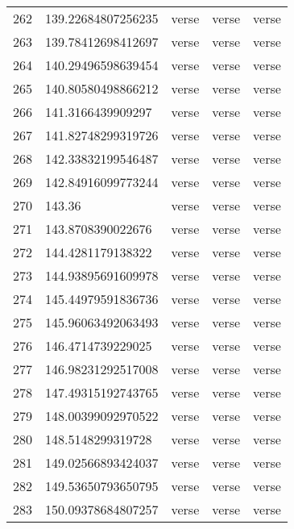 \begin{table}[]
\begin{tabular}{lllll}
    262  & 139.22684807256235 & verse        & verse           & verse          \\
    263  & 139.78412698412697 & verse        & verse           & verse          \\
    264  & 140.29496598639454 & verse        & verse           & verse          \\
    265  & 140.80580498866212 & verse        & verse           & verse          \\
    266  & 141.3166439909297  & verse        & verse           & verse          \\
    267  & 141.82748299319726 & verse        & verse           & verse          \\
    268  & 142.33832199546487 & verse        & verse           & verse          \\
    269  & 142.84916099773244 & verse        & verse           & verse          \\
    270  & 143.36             & verse        & verse           & verse          \\
    271  & 143.8708390022676  & verse        & verse           & verse          \\
    272  & 144.4281179138322  & verse        & verse           & verse          \\
    273  & 144.93895691609978 & verse        & verse           & verse          \\
    274  & 145.44979591836736 & verse        & verse           & verse          \\
    275  & 145.96063492063493 & verse        & verse           & verse          \\
    276  & 146.4714739229025  & verse        & verse           & verse          \\
    277  & 146.98231292517008 & verse        & verse           & verse          \\
    278  & 147.49315192743765 & verse        & verse           & verse          \\
    279  & 148.00399092970522 & verse        & verse           & verse          \\
    280  & 148.5148299319728  & verse        & verse           & verse          \\
    281  & 149.02566893424037 & verse        & verse           & verse          \\
    282  & 149.53650793650795 & verse        & verse           & verse          \\
    283  & 150.09378684807257 & verse        & verse           & verse          \\

\end{tabular}
\end{table}
